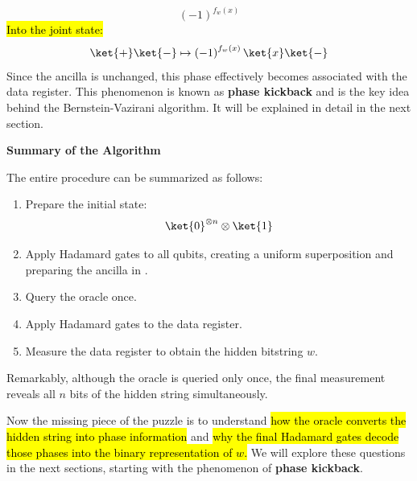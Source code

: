 \begin{equation*}
    \left(-1\right)^{f_w (x)}
\end{equation*}
\hl{Into the joint state:}
\begin{equation*}
    \ket{+}\ket{-} \mapsto \left(-1\right)^{f_w (x)} \ket{x}\ket{-}
\end{equation*}
Since the ancilla is unchanged, this phase effectively becomes associated with the data register. This phenomenon is known as \textbf{phase kickback} and is the key idea behind the Bernstein-Vazirani algorithm. It will be explained in detail in the next section.

\highspace
\begin{flushleft}
    \textcolor{Green3}{ \textbf{Summary of the Algorithm}}
\end{flushleft}
The entire procedure can be summarized as follows:
\begin{enumerate}
    \item[$\ket{\psi_0}$] Prepare the initial state:
        \begin{equation*}
            \ket{0}^{\otimes n} \otimes \ket{1}
        \end{equation*}
    \item[$\ket{\psi_1}$] Apply Hadamard gates to all qubits, creating a uniform superposition and preparing the ancilla in \ket{-}.
    \item[$\ket{\psi_2}$] Query the oracle once.
    \item[$\ket{\psi_3}$] Apply Hadamard gates to the data register.
        \setcounter{enumi}{3}
    \item Measure the data register to obtain the hidden bitstring $w$.
\end{enumerate}
Remarkably, although the oracle is queried only once, the final measurement reveals all $n$ bits of the hidden string simultaneously.

\highspace
Now the missing piece of the puzzle is to understand \hl{how the oracle converts the hidden string into phase information} and \hl{why the final Hadamard gates decode those phases into the binary representation of $w$.} We will explore these questions in the next sections, starting with the phenomenon of \textbf{phase kickback}.